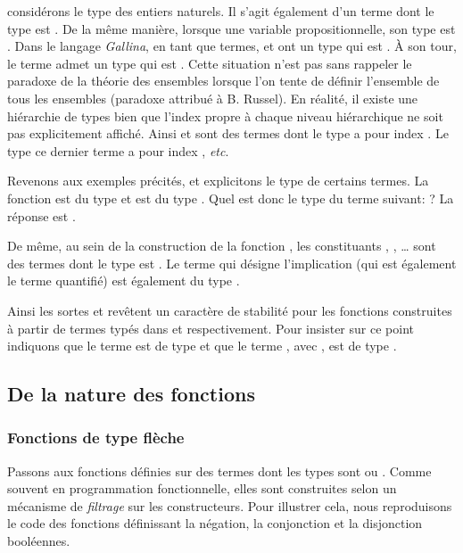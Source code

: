 \documentclass[a4paper,10pt]{article}
\begin{document}
considérons le type  des entiers naturels.  Il s'agit également d'un terme dont le type est .
De la même manière, lorsque  une variable propositionnelle, son type est .  Dans le langage
\emph{Gallina}, en tant que termes,  et  ont un type qui est .  À son tour, le terme
 admet un type qui est .  Cette situation n'est pas sans rappeler le paradoxe de la théorie
des ensembles lorsque l'on tente de définir l'ensemble de tous les ensembles (paradoxe attribué à
B. Russel).  En réalité, il existe une hiérarchie de types bien que l'index propre à chaque niveau
hiérarchique ne soit pas explicitement affiché.  Ainsi  et  sont des termes dont le type a
pour index .  Le type ce dernier terme a pour index , \emph{etc}.

Revenons aux exemples précités, et explicitons le type de certains termes.  La fonction
 est du type  et  est du type .
Quel est donc le type du terme suivant: ?  La réponse est .

De même, au sein de la construction de la fonction , les constituants ,
, \ldots{}  sont des termes dont le type est .  Le terme qui désigne l'implication (qui est
également le terme quantifié) est également du type .

Ainsi les sortes  et  revêtent un caractère de stabilité pour les fonctions construites à
partir de termes typés dans  et  respectivement.  Pour insister sur ce point indiquons que le
terme  est de type  et que le terme , avec , est de type
.


\subsection{De la nature des fonctions}
\label{sec:org157b72a}
\subsubsection{Fonctions de type flèche}
\label{sec:org7bd7ccf}
Passons aux fonctions définies sur des termes dont les types sont  ou .  Comme souvent en
programmation fonctionnelle, elles sont construites selon un mécanisme de \emph{filtrage} sur les constructeurs.
Pour illustrer cela, nous reproduisons le code des fonctions définissant la négation, la conjonction et la
disjonction booléennes.
\end{document}
